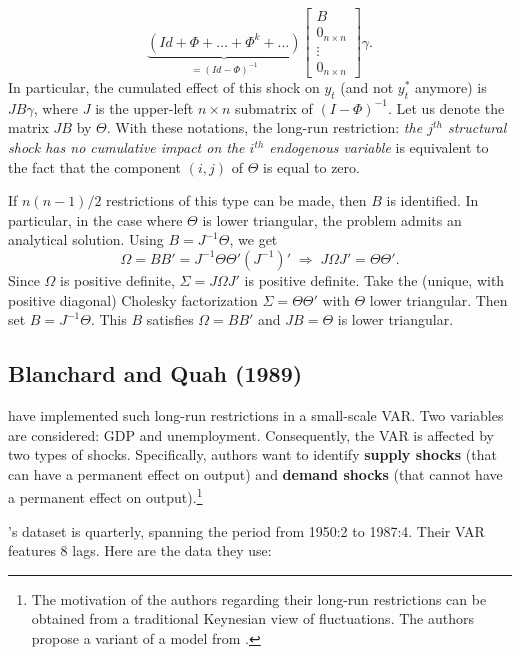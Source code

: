 \documentclass[
  12pt,
]{book}
\theoremstyle{definition}
\theoremstyle{definition}
\theoremstyle{definition}
\theoremstyle{definition}
\theoremstyle{remark}
\begin{document}
\[
\underbrace{(Id+\Phi+\ldots+\Phi^{k}+\ldots)}_{=(Id - \Phi)^{-1}}\left[\begin{array}{c}
B \\
0_{n \times n}  \\
\vdots \\
0_{n \times n}
\end{array}\right]\gamma.
\]
In particular, the cumulated effect of this shock on \(y_t\) (and not \(y_t^*\) anymore) is \(J B \gamma\), where \(J\) is the upper-left \(n \times n\) submatrix of \((I - \Phi)^{-1}\). Let us denote the matrix \(J B\) by \(\Theta\). With these notations, the long-run restriction: \emph{the \(j^{th}\) structural shock has no cumulative impact on the \(i^{th}\) endogenous variable} is equivalent to the fact that the component \((i,j)\) of \(\Theta\) is equal to zero.

If \(n(n-1)/2\) restrictions of this type can be made, then \(B\) is identified. In particular, in the case where \(\Theta\) is lower triangular, the problem admits an analytical solution. Using \(B = J^{-1} \Theta\), we get
\[
\Omega = B B' = J^{-1} \Theta \Theta' (J^{-1})' \;\Rightarrow\; J \Omega J' = \Theta \Theta'.
\]
Since \(\Omega\) is positive definite, \(\Sigma = J \Omega J'\) is positive definite. Take the (unique, with positive diagonal) Cholesky factorization \(\Sigma = \Theta \Theta'\) with \(\Theta\) lower triangular. Then set \(B = J^{-1} \Theta\). This \(B\) satisfies \(\Omega = B B'\) and \(J B = \Theta\) is lower triangular.

\subsection{Blanchard and Quah (1989)}\label{blanchard-and-quah-1989}

\citet{Blanchard_Quah_1989} have implemented such long-run restrictions in a small-scale VAR. Two variables are considered: GDP and unemployment. Consequently, the VAR is affected by two types of shocks. Specifically, authors want to identify \textbf{supply shocks} (that can have a permanent effect on output) and \textbf{demand shocks} (that cannot have a permanent effect on output).\footnote{The motivation of the authors regarding their long-run restrictions can be obtained from a traditional Keynesian view of fluctuations. The authors propose a variant of a model from \citet{Fischer_1977}.
}

\citet{Blanchard_Quah_1989}'s dataset is quarterly, spanning the period from 1950:2 to 1987:4. Their VAR features 8 lags. Here are the data they use:
\end{document}

